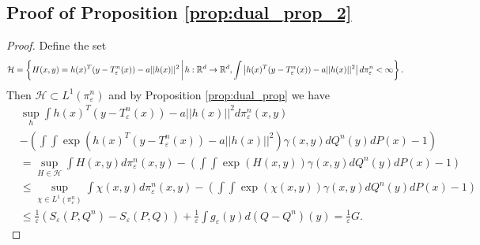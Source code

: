 \documentclass{article}
\theoremstyle{definition}
\newcommand{\geps}{g_\varepsilon}
\newcommand{\Teps}{T_\varepsilon}
\begin{document}
\subsection{Proof of Proposition \ref{prop:dual_prop_2}} 
\begin{proof}
    Define the set 
    \begin{equation*}
        \mathcal{H} = \left \{ H(x,y) = h(x)^T(y - \Teps^n(x)) - a||h(x)||^2 \hspace{0.05cm} \bigg | \hspace{0.05cm} h:\mathbb{R}^d \rightarrow \mathbb{R}^d , \int \left | h(x)^T(y - \Teps^n(x)) - a||h(x)||^2\right | d\pi_\varepsilon^n < \infty \right \}.
    \end{equation*}
    Then $\mathcal{H} \subset L^1(\pi_\varepsilon^n)$ and by Proposition \ref{prop:dual_prop} we have
    \begin{align*} 
         &\sup_{h} \int h(x)^T(y - \Teps^n(x)) - a||h(x)||^2 d\pi_\varepsilon^n(x,y) \nonumber \\
         & - \left (\int\int \exp\left ( h(x)^T(y - \Teps^n(x)) - a||h(x)||^2 \right )\gamma(x,y) dQ^n(y)dP(x) - 1 \right ) \\
        &= \sup_{H \in \mathcal{H}} \int H(x,y) d\pi_\varepsilon^n(x,y) - \left (\int\int \exp(H(x,y) )\gamma(x,y) dQ^n(y)dP(x) - 1 \right ) \\
        &\leq \sup_{\chi \in L^1(\pi_\varepsilon^n)} \int \chi(x,y) d\pi_\varepsilon^n(x,y) - \left (\int\int \exp(\chi(x,y))\gamma(x,y) dQ^n(y)dP(x) - 1 \right ) \\
        &\leq \frac{1}{\varepsilon}(S_\varepsilon(P,Q^n) - S_\varepsilon(P,Q)) + \frac{1}{\varepsilon}\int \geps(y) d(Q-Q^n)(y) = \frac{1}{\varepsilon}G.
    \end{align*}
\end{proof}
\end{document}
